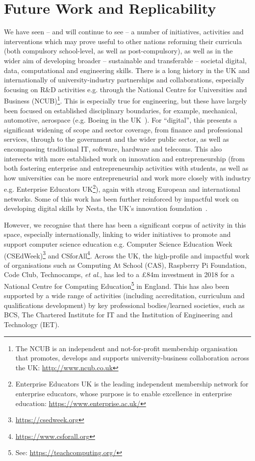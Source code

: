 \documentclass[conference]{IEEEtran}
\begin{document}
\section{Future Work and Replicability}\label{concl}

We have seen -- and will continue to see -- a number of initiatives,
activities and interventions which may prove useful to other nations
reforming their curricula (both compulsory school-level, as well as
post-compulsory), as well as in the wider aim of developing broader --
sustainable and transferable -- societal digital, data, computational
and engineering skills. There is a long history in the UK and
internationally of university-industry partnerships and
collaborations, especially focusing on R\&D activities e.g. through
the National Centre for Universities and Business (NCUB)\footnote{The
NCUB is an independent and not-for-profit membership organisation that
promotes, develops and supports university-business collaboration
across the UK: \url{http://www.ncub.co.uk}}. This is especially true
for engineering, but these have largely been focused on established
disciplinary boundaries, for example, mechanical, automotive,
aerospace (e.g. Boeing in the UK~\cite{boeinguk:2020}). For
``digital'', this presents a significant widening of scope and sector
coverage, from finance and professional services, through to the
government and the wider public sector, as well as encompassing
traditional IT, software, hardware and telecoms. This also intersects
with more established work on innovation and entrepreneurship (from
both fostering enterprise and entrepreneurship activities with
students, as well as how universities can be more entrepreneurial and
work more closely with industry e.g. Enterprise Educators
UK\footnote{Enterprise Educators UK is the leading independent
membership network for enterprise educators, whose purpose is to
enable excellence in enterprise education:
\url{https://www.enterprise.ac.uk/}}), again with strong European and
international networks. Some of this work has been further reinforced
by impactful work on developing digital skills by Nesta, the UK's innovation
foundation~\cite{nestadeliveringdigitalskills:2018,nestawhatdigitalskills:2018}.

However, we recognise that there has been a significant corpus of
activity in this space, especially internationally, linking to wider
initiatives to promote and support computer science education
e.g. Computer Science Education Week
(CSEdWeek)\footnote{\url{https://csedweek.org}} and
CSforAll\footnote{\url{https://www.csforall.org}}. Across the UK, the
high-profile and impactful work of organisations such as Computing At
School (CAS), Raspberry Pi Foundation, Code Club, Technocamps, {\it et
al\/}., has led to a \pounds84m investment in 2018 for a National
Centre for Computing Education\footnote{See:
\url{https://teachcomputing.org/}} in England. This has also been
supported by a wide range of activities (including accreditation,
curriculum and qualifications development) by key professional
bodies/learned societies, such as BCS, The Chartered Institute for IT
and the Institution of Engineering and Technology (IET).
\end{document}
